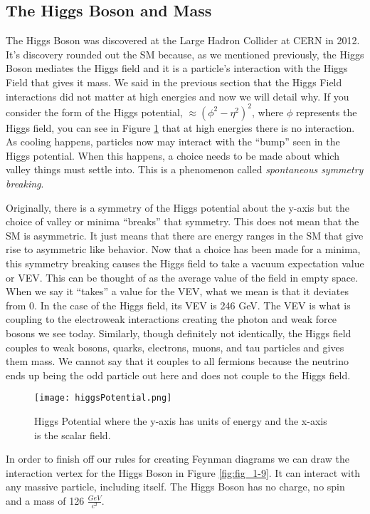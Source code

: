 \subsection{The Higgs Boson and Mass}

The Higgs Boson was discovered at the Large Hadron Collider at CERN in 2012. It's discovery rounded out the SM because, as we mentioned previously, the Higgs Boson mediates the Higgs field and it is a particle's interaction with the Higgs Field that gives it mass.
We said in the previous section that the Higgs Field interactions did not matter at high energies and now we will detail why. If you consider the form of the Higgs potential, $\approx (\phi^2 - \eta^2)^2$, where $\phi$ represents the Higgs field, you can see in Figure \ref{fig:fig_1-8} that at high energies there is no interaction.
As cooling happens, particles now may interact with the ``bump'' seen in the Higgs potential. When this happens, a choice needs to be made about which valley things must settle into. This is a phenomenon called \textit{spontaneous symmetry breaking}.

Originally, there is a symmetry of the Higgs potential about the y-axis but the choice of valley or minima ``breaks'' that symmetry. This does not mean that the SM is asymmetric. It just means that there are energy ranges in the SM that give rise to asymmetric like behavior.
Now that a choice has been made for a minima, this symmetry breaking causes the Higgs field to take a vacuum expectation value or VEV. This can be thought of as the average value of the field in empty space.
When we say it ``takes'' a value for the VEV, what we mean is that it deviates from $0$. In the case of the Higgs field, its VEV is 246 GeV. The VEV is what is coupling to the electroweak interactions creating the photon and weak force bosons we see today.
Similarly, though definitely not identically, the Higgs field couples to weak bosons, quarks, electrons, muons, and tau particles and gives them mass. We cannot say that it couples to all fermions because the neutrino ends up being the odd particle out here and does not couple to the Higgs field.
\begin{figure} %
   \centering
   \texttt{[image: higgsPotential.png]}
   \caption{Higgs Potential where the y-axis has units of energy and the x-axis is the scalar field.}
   \label{fig:fig_1-8}
\end{figure}
In order to finish off our rules for creating Feynman diagrams we can draw the interaction vertex for the Higgs Boson in Figure \ref{fig:fig_1-9}. 
It can interact with any massive particle, including itself. 
The Higgs Boson has no charge, no spin and a mass of 126 $\frac{GeV}{c^2}$.


